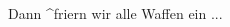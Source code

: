 \documentclass{leadsheet}
\begin{document}
\begin{song}
\begin{multicols}{2}
    \begin{chorus}
      Dann ^friern wir alle Waffen ein ... \\
    \end{chorus}

  \end{multicols}
\end{song}
\end{document}
